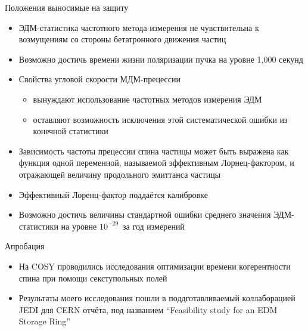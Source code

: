 \documentclass[14pt]{beamer}
\begin{document}
\begin{frame}{Положения выносимые на защиту}
	\begin{itemize}
		\item ЭДМ-статистика частотного метода измерения не чувствительна к возмущениям со стороны бетатронного движения частиц
		\item Возможно достичь времени жизни поляризации пучка на уровне 1,000 секунд
		\item Свойства угловой скорости МДМ-прецессии 
			\begin{itemize}
				\item вынуждают использование частотных методов измерения ЭДМ
				\item оставляют возможность исключения этой систематической ошибки из конечной статистики
			\end{itemize}
	\end{itemize}
\end{frame}
\begin{frame}
	\begin{itemize}
		\item Зависимость частоты прецессии спина частицы может быть выражена как функция одной переменной, называемой эффективным Лорнец-фактором, и отражающей величину продольного эмиттанса частицы
		\item Эффективный Лоренц-фактор поддаётся калибровке
		\item Возможно достичь величины стандартной ошибки среднего значения ЭДМ-статистики на уровне $10^{-29}$\ecm~за год измерений
	\end{itemize}
\end{frame}

\begin{frame}{Апробация}
	\begin{itemize}
		\item На COSY проводились исследования оптимизации времени когерентности спина при помощи секступольных полей
		\item Результаты моего исследования пошли в поддготавливаемый коллаборацией JEDI для CERN отчёта, под названием ``Feasibility study for an EDM Storage Ring''
	\end{itemize}
\end{frame}
\end{document}
